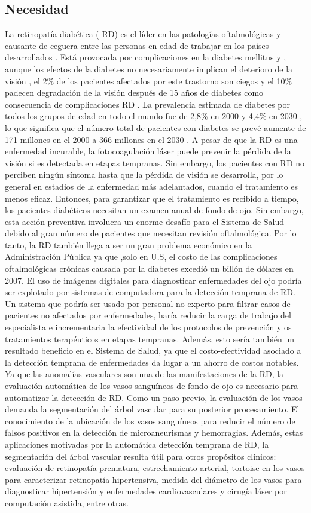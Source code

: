 	\subsection{Necesidad}
	La retinopatía diabética ( RD) es el líder en las patologías oftalmológicas y causante de ceguera entre las personas en edad de trabajar en los países desarrollados . Está provocada por complicaciones en la diabetes mellitus y , aunque los efectos de la diabetes no necesariamente implican el deterioro de la visión , el 2\% de los pacientes afectados por este trastorno son ciegos y el 10\% padecen  degradación de la visión después de 15 años de diabetes como consecuencia de complicaciones RD . La prevalencia estimada de diabetes por todos los grupos de edad en todo el mundo fue de 2,8\% en 2000 y 4,4\% en 2030 , lo que significa que el número total de pacientes con diabetes se prevé aumente de 171 millones en el  2000 a 366 millones en el 2030 .
	A pesar de que la RD es una enfermedad incurable, la fotocoagulación láser puede prevenir la pérdida de la visión si es detectada en etapas tempranas. Sin embargo, los pacientes con RD no perciben ningún síntoma hasta que la pérdida de visión se desarrolla, por lo general en estadios de la enfermedad más adelantados, cuando el tratamiento es menos eficaz. Entonces, para garantizar que el tratamiento es recibido a tiempo, los pacientes diabéticos necesitan un examen anual de fondo de ojo. Sin embargo, esta acción preventiva involucra un enorme desafío para el Sistema de Salud debido  al gran número de pacientes que necesitan revisión oftalmológica. Por lo tanto, la RD también llega a ser un gran problema económico en la  Administración Pública ya que ,solo en U.S, el costo de las complicaciones oftalmológicas crónicas causada por la diabetes excedió un billón de dólares en 2007.
El uso de imágenes digitales para diagnosticar enfermedades del ojo podría ser explotado por sistemas de computadora para la detección temprana de RD. Un sistema que podría ser  usado por personal no experto para filtrar casos de pacientes no afectados por enfermedades, haría reducir la carga de trabajo del especialista e incrementaria la efectividad de los protocolos de prevención y os tratamientos terapéuticos en etapas tempranas. Además, esto sería también un resultado beneficio en el Sistema de Salud, ya que el costo-efectividad asociado a la detección temprana de enfermedades da lugar a un ahorro de costos notables.
Ya que las anomalías vasculares son una de las manifestaciones de la RD, la evaluación automática de los vasos sanguíneos de fondo de ojo es necesario para automatizar la detección de RD. Como un paso previo, la evaluación de los vasos demanda la segmentación del árbol vascular para su posterior procesamiento. El conocimiento de la ubicación de los vasos sanguíneos para reducir el número de falsos positivos en la detección de microaneurismas y hemorragias. Además, estas aplicaciones motivadas por la automática detección temprana de RD, la segmentación del árbol vascular resulta útil para otros propósitos clínicos: evaluación de retinopatía prematura, estrechamiento arterial, tortoise en los vasos para caracterizar retinopatía hipertensiva, medida del diámetro de los vasos para diagnosticar hipertensión y enfermedades cardiovasculares y cirugía láser por computación asistida, entre otras.
